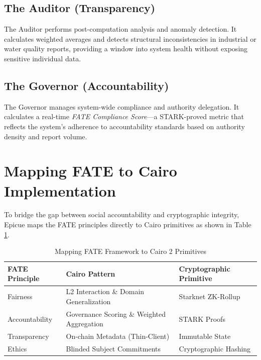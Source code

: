 \documentclass[12pt,a4paper]{article}
\begin{document}
\subsection{The Auditor (Transparency)}
The Auditor performs post-computation analysis and anomaly detection. It calculates weighted averages and detects structural inconsistencies in industrial or water quality reports, providing a window into system health without exposing sensitive individual data.

\subsection{The Governor (Accountability)}
The Governor manages system-wide compliance and authority delegation. It calculates a real-time \textit{FATE Compliance Score}—a STARK-proved metric that reflects the system's adherence to accountability standards based on authority density and report volume.

\section{Mapping FATE to Cairo Implementation}
To bridge the gap between social accountability and cryptographic integrity, Epicue maps the FATE principles directly to Cairo primitives as shown in Table \ref{tab:fate_mapping}.

\begin{table}[h]
    \centering
    \caption{Mapping FATE Framework to Cairo 2 Primitives}
    \label{tab:fate_mapping}
    \begin{tabular}{lll}
        \toprule
        \textbf{FATE Principle} & \textbf{Cairo Pattern} & \textbf{Cryptographic Primitive} \\
        \midrule
        Fairness & L2 Interaction \& Domain Generalization & Starknet ZK-Rollup \\
        Accountability & Governance Scoring \& Weighted Aggregation & STARK Proofs \\
        Transparency & On-chain Metadata (Thin-Client) & Immutable State \\
        Ethics & Blinded Subject Commitments & Cryptographic Hashing \\
        \bottomrule
    \end{tabular}
\end{table}
\end{document}
